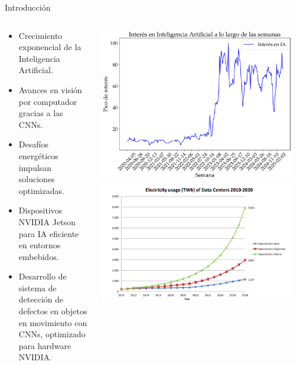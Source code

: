 \documentclass[spanish]{beamer}
\begin{document}
\begin{frame}{Introducción}
    \begin{columns}
        \begin{column}{0.45\textwidth}
            \begin{itemize}
                \item Crecimiento exponencial de la Inteligencia Artificial.
                \item Avances en visión por computador gracias a las CNNs.
                \item Desafíos energéticos impulsan soluciones optimizadas.
                \item Dispositivos NVIDIA Jetson para IA eficiente en entornos embebidos.
                \item Desarrollo de sistema de detección de defectos en objetos en movimiento con CNNs, optimizado para hardware NVIDIA.
            \end{itemize}
        \end{column}
        \begin{column}{0.5\textwidth}
            \includegraphics[width=0.95\textwidth]{images/introduccion/interes_en_ia.pdf}
            \includegraphics[width=0.95\textwidth]{images/introduccion/consumo_electrico_datacenters.png}
        \end{column}
    \end{columns}
\end{frame}
\end{document}
